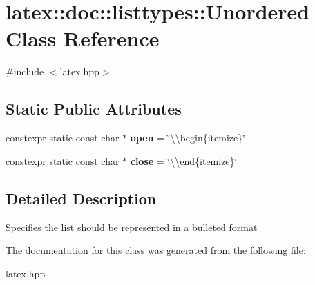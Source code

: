 \hypertarget{classlatex_1_1doc_1_1listtypes_1_1Unordered}{\section{latex\-:\-:doc\-:\-:listtypes\-:\-:Unordered Class Reference}
\label{classlatex_1_1doc_1_1listtypes_1_1Unordered}
}


{\ttfamily \#include $<$latex.\-hpp$>$}

\subsection*{Static Public Attributes}
\begin{DoxyCompactItemize}
\item 
\hypertarget{classlatex_1_1doc_1_1listtypes_1_1Unordered_a6785c1fc27b26fff3053c51a65a03be4}{constexpr static const char $\ast$ {\bfseries open} = \char`\"{}\textbackslash{}\textbackslash{}begin\{itemize\}\char`\"{}}\label{classlatex_1_1doc_1_1listtypes_1_1Unordered_a6785c1fc27b26fff3053c51a65a03be4}

\item 
\hypertarget{classlatex_1_1doc_1_1listtypes_1_1Unordered_ad2f22acaf4323ed68d3bebffec7a069e}{constexpr static const char $\ast$ {\bfseries close} = \char`\"{}\textbackslash{}\textbackslash{}end\{itemize\}\char`\"{}}\label{classlatex_1_1doc_1_1listtypes_1_1Unordered_ad2f22acaf4323ed68d3bebffec7a069e}

\end{DoxyCompactItemize}


\subsection{Detailed Description}
Specifies the list should be represented in a bulleted format 

The documentation for this class was generated from the following file\-:\begin{DoxyCompactItemize}
\item 
latex.\-hpp\end{DoxyCompactItemize}
